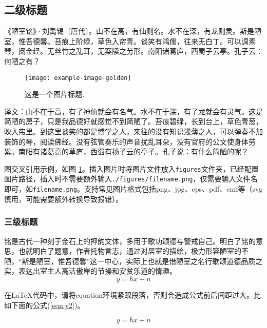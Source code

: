 \subsection{二级标题}
《陋室铭》·刘禹锡〔唐代〕。山不在高，有仙则名。水不在深，有龙则灵。斯是陋室，惟吾德馨。苔痕上阶绿，草色入帘青。谈笑有鸿儒，往来无白丁。可以调素琴，阅金经。无丝竹之乱耳，无案牍之劳形。南阳诸葛庐，西蜀子云亭。孔子云：何陋之有？

\begin{figure}[!h]
    \centering
    \texttt{[image: example-image-golden]}
    \caption{这是一个图片标题.}
    \label{fig:exp1}
\end{figure}

译文：山不在于高，有了神仙就会有名气。水不在于深，有了龙就会有灵气。这是简陋的房子，只是我品德好就感觉不到简陋了。苔痕碧绿，长到台上，草色青葱，映入帘里。到这里谈笑的都是博学之人，来往的没有知识浅薄之人，可以弹奏不加装饰的琴，阅读佛经。没有弦管奏乐的声音扰乱耳朵，没有官府的公文使身体劳累。南阳有诸葛亮的草庐，西蜀有扬子云的亭子。孔子说：有什么简陋的呢？

图交叉引用示例，如图 \ref{fig:exp1}。插入图片时将图片文件放入\verb|figures|文件夹，已经配置图片路径，插入时不需要额外输入\verb|./figures/filename.png|，仅需要输入文件名即可，如\verb|filename.png|。支持常见图片格式包括png、jpg、eps、pdf、emf等（svg慎用，可能需要额外转换导致报错）。

\subsubsection{三级标题}

铭是古代一种刻于金石上的押韵文体，多用于歌功颂德与警戒自己。明白了铭的意思，也就明白了题意，作者托物言志，通过对居室的描绘，极力形容陋室的不陋，“斯是陋室，惟吾德馨”这一中心，实际上也就是借陋室之名行歌颂道德品质之实，表达出室主人高洁傲岸的节操和安贫乐道的情趣。
\begin{equation}
    \label{eqn:y1}
    y = hx+n
\end{equation}

在LaTeX代码中，请将equation环境紧跟段落，否则会造成公式前后间距过大。比如下面的公式(\ref{eqn:y2})。

\begin{equation}
    \label{eqn:y2}
    y = hx+n
\end{equation}

